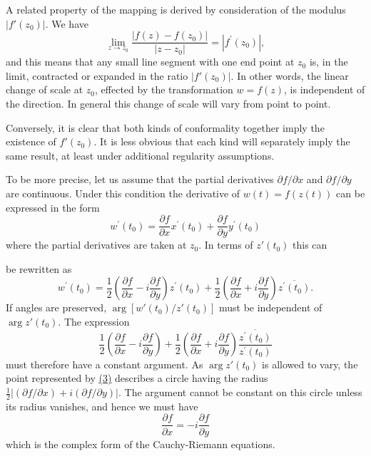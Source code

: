 A related property of the mapping is derived by consideration of the modulus $|f'(z_{0})|$. We have
\begin{equation*}
\lim _ {z \rightarrow z _ {0}} \frac {| f (z) - f (z _ {0}) |}{| z - z _ {0} |} = | f ^ {\prime} (z _ {0}) |,
\end{equation*}
and this means that any small line segment with one end point at $z_{0}$ is, in the limit, contracted or expanded in the ratio $|f'(z_{0})|$. In other words, the linear change of scale at $z_{0}$, effected by the transformation $w = f(z)$, is independent of the direction. In general this change of scale will vary from point to point.

Conversely, it is clear that both kinds of conformality together imply the existence of $f'(z_{0})$. It is less obvious that each kind will separately imply the same result, at least under additional regularity assumptions.

To be more precise, let us assume that the partial derivatives $\partial f/\partial x$ and $\partial f/\partial y$ are continuous. Under this condition the derivative of $w(t) = f(z(t))$ can be expressed in the form
\begin{equation*}
w ^ {\prime} (t _ {0}) = \frac {\partial f}{\partial x} x ^ {\prime} (t _ {0}) + \frac {\partial f}{\partial y} y ^ {\prime} (t _ {0})
\end{equation*}
where the partial derivatives are taken at $z_0$. In terms of $z'(t_0)$ this can


be rewritten as
\begin{equation*}
w ^ {\prime} (t _ {0}) = \frac {1}{2} \left(\frac {\partial f}{\partial x} - i \frac {\partial f}{\partial y}\right) z ^ {\prime} (t _ {0}) + \frac {1}{2} \left(\frac {\partial f}{\partial x} + i \frac {\partial f}{\partial y}\right) \overline {{z ^ {\prime} (t _ {0})}}.
\end{equation*}
If angles are preserved, $\arg [w'(t_0) / z'(t_0)]$ must be independent of $\arg z'(t_0)$. The expression
\begin{equation*}
\frac {1}{2} \left(\frac {\partial f}{\partial x} - i \frac {\partial f}{\partial y}\right) + \frac {1}{2} \left(\frac {\partial f}{\partial x} + i \frac {\partial f}{\partial y}\right) \frac {\overline {{z ^ {\prime} (t _ {0})}}}{z ^ {\prime} (t _ {0})}\tag{3}\label{eq:3.3}
\end{equation*}
must therefore have a constant argument. As $\arg z'(t_{0})$ is allowed to vary, the point represented by \hyperref[eq:3.3]{(3)} describes a circle having the radius $\frac{1}{2}|(\partial f/\partial x)+i(\partial f/\partial y)|$. The argument cannot be constant on this circle unless its radius vanishes, and hence we must have
\begin{equation*}
\frac {\partial f}{\partial x} = - i \frac {\partial f}{\partial y}\tag{4}\label{eq:3.4}
\end{equation*}
which is the complex form of the Cauchy-Riemann equations.

